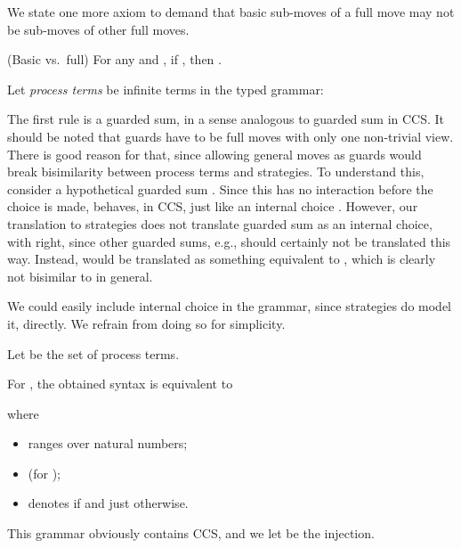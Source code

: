 \documentclass{LMCS}
\renewcommand{\with}[1]{\langle #1 \rangle}
\theoremstyle{plain}\newtheorem{satz}[thm]{Satz}
\begin{document}
We state one more axiom to demand that basic sub-moves of a full move
 may not be sub-moves of other full moves.
\begin{ax}
  \begin{axioms}
  \item (Basic vs.\ full) For any  and , if , then .
    \label{basic:full}
  \end{axioms}
\end{ax}


  Let \emph{process terms} be infinite terms in the typed grammar:

    The first rule is a guarded sum, in a sense analogous to guarded
    sum in CCS. It should be noted that guards have to be full moves
    with only one non-trivial view. There is good reason for that,
    since allowing general moves as guards would break bisimilarity
    between process terms and strategies. To understand this, consider
    a hypothetical guarded sum . Since this has no
    interaction before the choice is made,  behaves, in CCS, just
    like an internal choice . However, our
    translation to strategies does not translate guarded sum as an
    internal choice, with right, since other guarded sums, e.g.,  should certainly not be translated this way. Instead, 
    would be translated as something equivalent to , which is clearly not
    bisimilar to  in general.


    We could easily include internal choice in the grammar, since
    strategies do model it, directly. We refrain from doing so for
    simplicity.


\begin{defi}
  Let  be the set of process terms.
\end{defi}


\begin{exa}\label{ex:ccs:terms}
  For , the obtained syntax is equivalent to
  where
  \begin{itemize}
  \item  ranges over natural numbers;
  \item  (for );
  \item  denotes  if  and
    just  otherwise.
  \end{itemize}
  This grammar obviously contains CCS, and we let  be the injection.
\end{exa}
\end{document}
